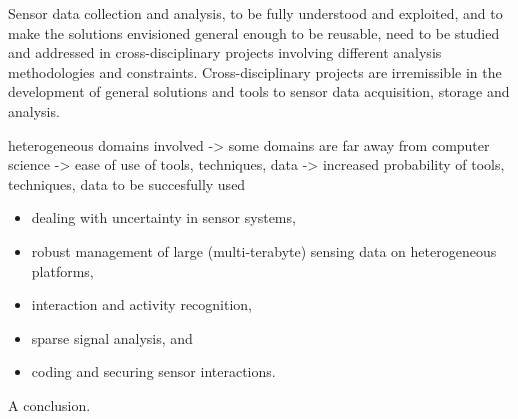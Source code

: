 \documentclass[times,10pt,twocolumn]{article}
\begin{document}
Sensor data collection and analysis, to be fully understood and exploited, and to make the solutions envisioned general 
enough to be reusable, need to be studied and addressed in cross-disciplinary projects involving different analysis 
methodologies and constraints. 
Cross-disciplinary projects are irremissible in the development of general solutions and tools to sensor data acquisition, 
storage and analysis.



heterogeneous domains involved ->
some domains are far away from computer science ->
ease of use of tools, techniques, data ->
increased probability of tools, techniques, data to be succesfully used






\begin{itemize}
  \setlength{\itemsep}{1pt}
  \setlength{\parskip}{0pt}
  \setlength{\parsep}{0pt}
\item dealing with uncertainty in sensor systems,
\item robust management of large (multi-terabyte) sensing data on
  heterogeneous platforms,
\item interaction and activity recognition,
\item sparse signal analysis, and
\item coding and securing sensor interactions.
\end{itemize}



A conclusion.




\end{document}
